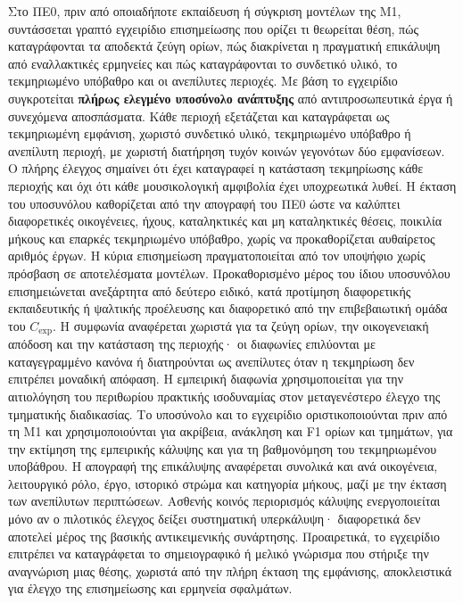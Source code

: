 \documentclass[11pt,a4paper]{article}
\begin{document}
Στο ΠΕ0, πριν από οποιαδήποτε εκπαίδευση ή σύγκριση μοντέλων της M1, συντάσσεται γραπτό εγχειρίδιο επισημείωσης που ορίζει τι θεωρείται θέση, πώς καταγράφονται τα αποδεκτά ζεύγη ορίων, πώς διακρίνεται η πραγματική επικάλυψη από εναλλακτικές ερμηνείες και πώς καταγράφονται το συνδετικό υλικό, το τεκμηριωμένο υπόβαθρο και οι ανεπίλυτες περιοχές. Με βάση το εγχειρίδιο συγκροτείται \textbf{πλήρως ελεγμένο υποσύνολο ανάπτυξης} από αντιπροσωπευτικά έργα ή συνεχόμενα αποσπάσματα. Κάθε περιοχή εξετάζεται και καταγράφεται ως τεκμηριωμένη εμφάνιση, χωριστό συνδετικό υλικό, τεκμηριωμένο υπόβαθρο ή ανεπίλυτη περιοχή, με χωριστή διατήρηση τυχόν κοινών γεγονότων δύο εμφανίσεων. Ο πλήρης έλεγχος σημαίνει ότι έχει καταγραφεί η κατάσταση τεκμηρίωσης κάθε περιοχής και όχι ότι κάθε μουσικολογική αμφιβολία έχει υποχρεωτικά λυθεί. Η έκταση του υποσυνόλου καθορίζεται από την απογραφή του ΠΕ0 ώστε να καλύπτει διαφορετικές οικογένειες, ήχους, καταληκτικές και μη καταληκτικές θέσεις, ποικιλία μήκους και επαρκές τεκμηριωμένο υπόβαθρο, χωρίς να προκαθορίζεται αυθαίρετος αριθμός έργων. Η κύρια επισημείωση πραγματοποιείται από τον υποψήφιο χωρίς πρόσβαση σε αποτελέσματα μοντέλων. Προκαθορισμένο μέρος του ίδιου υποσυνόλου επισημειώνεται ανεξάρτητα από δεύτερο ειδικό, κατά προτίμηση διαφορετικής εκπαιδευτικής ή ψαλτικής προέλευσης και διαφορετικό από την επιβεβαιωτική ομάδα του $C_{\mathrm{exp}}$. Η συμφωνία αναφέρεται χωριστά για τα ζεύγη ορίων, την οικογενειακή απόδοση και την κατάσταση της περιοχής· οι διαφωνίες επιλύονται με καταγεγραμμένο κανόνα ή διατηρούνται ως ανεπίλυτες όταν η τεκμηρίωση δεν επιτρέπει μοναδική απόφαση. Η εμπειρική διαφωνία χρησιμοποιείται για την αιτιολόγηση του περιθωρίου πρακτικής ισοδυναμίας στον μεταγενέστερο έλεγχο της τμηματικής διαδικασίας. Το υποσύνολο και το εγχειρίδιο οριστικοποιούνται πριν από τη M1 και χρησιμοποιούνται για ακρίβεια, ανάκληση και F1 ορίων και τμημάτων, για την εκτίμηση της εμπειρικής κάλυψης και για τη βαθμονόμηση του τεκμηριωμένου υποβάθρου. Η απογραφή της επικάλυψης αναφέρεται συνολικά και ανά οικογένεια, λειτουργικό ρόλο, έργο, ιστορικό στρώμα και κατηγορία μήκους, μαζί με την έκταση των ανεπίλυτων περιπτώσεων. Ασθενής κοινός περιορισμός κάλυψης ενεργοποιείται μόνο αν ο πιλοτικός έλεγχος δείξει συστηματική υπερκάλυψη· διαφορετικά δεν αποτελεί μέρος της βασικής αντικειμενικής συνάρτησης. Προαιρετικά, το εγχειρίδιο επιτρέπει να καταγράφεται το σημειογραφικό ή μελικό γνώρισμα που στήριξε την αναγνώριση μιας θέσης, χωριστά από την πλήρη έκταση της εμφάνισης, αποκλειστικά για έλεγχο της επισημείωσης και ερμηνεία σφαλμάτων.
\end{document}
